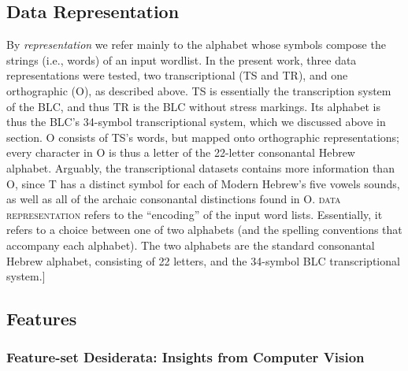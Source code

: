 \subsection {Data Representation} 
\label{sec:datarep}
By \emph{representation} we refer mainly to the alphabet whose 
symbols compose the strings (i.e., words) 
of an input wordlist.
In the present work, three data representations were tested, two transcriptional 
(TS and TR), and one orthographic (O), as described above.
TS is essentially the transcription system of the BLC, and thus TR is the BLC without stress markings. 
Its alphabet is thus the BLC's 34-symbol
transcriptional system, which we discussed above in section.
O consists of TS's words, but mapped onto orthographic 
representations; every character in O is thus
a letter of the 22-letter consonantal Hebrew alphabet.
Arguably, the transcriptional datasets contains more information than O,
since T has a distinct symbol for each of Modern Hebrew's five vowels sounds,
as well as all of the archaic consonantal distinctions found in O. 
\textsc{data representation} refers to the ``encoding'' of the input
word lists. Essentially, it refers to a choice between one of two alphabets (and the spelling conventions that 
accompany each alphabet). The two alphabets are the standard consonantal Hebrew alphabet, consisting of 22 letters,
and the 34-symbol \ac{BLC} transcriptional system.]

\subsection{Features}   %
\label{sec:features}

\subsubsection{Feature-set Desiderata: Insights from Computer Vision}

